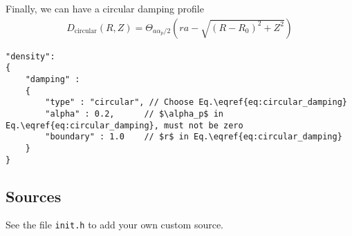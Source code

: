 Finally, we can have a circular damping profile
\begin{align} \label{eq:circular_damping}
    D_\mathrm{circular}(R,Z) = \Theta_{ a \alpha_p/2}\left( r a- \sqrt{(R-R_0)^2 + Z^2}\right)
\end{align}
\begin{verbatim}
"density":
{
    "damping" :
    {
        "type" : "circular", // Choose Eq.\eqref{eq:circular_damping}
        "alpha" : 0.2,      // $\alpha_p$ in Eq.\eqref{eq:circular_damping}, must not be zero
        "boundary" : 1.0    // $r$ in Eq.\eqref{eq:circular_damping}
    }
}
\end{verbatim}

\subsection{Sources} \label{sec:sources}
See the file {\tt init.h} to add your own custom source.

